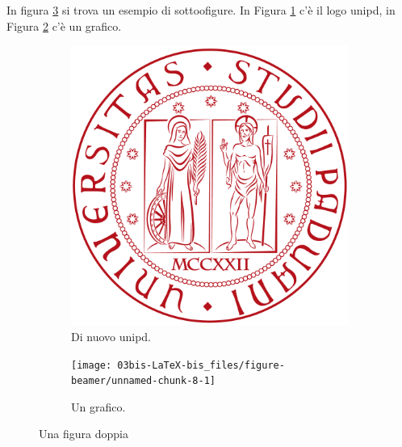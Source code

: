 \documentclass[
  ignorenonframetext,
]{beamer}
\begin{document}
\begin{frame}{}
\protect\hypertarget{section-3}{}
In figura \ref{fig:doppia} si trova un esempio di sottoofigure. In
Figura \ref{sub:unipd1} c'è il logo unipd, in Figura \ref{sub:grafico}
c'è un grafico.

\begin{figure}
\centering
\begin{subfigure}{0.3\textwidth}

\begin{center}\includegraphics[width=0.5\linewidth]{img/unipd} \end{center}
\caption{Di nuovo unipd.}
\label{sub:unipd1}
\end{subfigure}
\begin{subfigure}{0.3\textwidth}

\begin{center}\texttt{[image: 03bis-LaTeX-bis\_files/figure-beamer/unnamed-chunk-8-1]} \end{center}
\caption{Un grafico.}
\label{sub:grafico}
\end{subfigure}
\caption{Una figura doppia}
\label{fig:doppia}
\end{figure}
\end{frame}
\end{document}
